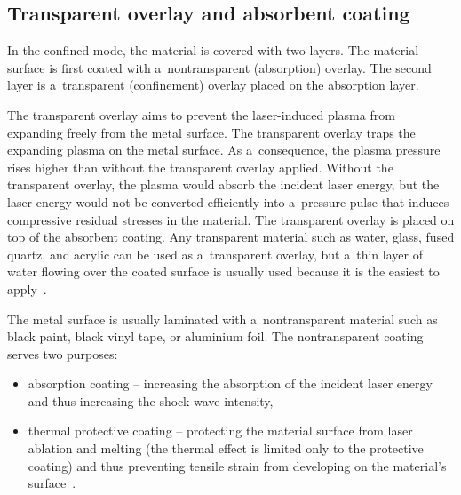 \subsection{Transparent overlay and absorbent coating}

In the confined mode, the material is covered with two layers. The material surface is first coated with a~nontransparent (absorption) overlay. The second layer is a~transparent (confinement) overlay placed on the absorption layer.

The transparent overlay aims to prevent the laser-induced plasma from expanding freely from the metal surface.  The transparent overlay traps the expanding plasma on the metal surface. As a~consequence, the plasma pressure rises higher than without the transparent overlay applied. Without the transparent overlay, the plasma would absorb the incident laser energy, but the laser energy would not be converted efficiently into a~pressure pulse that induces compressive residual stresses in the material. The transparent overlay is placed on top of the absorbent coating. Any transparent material such as water, glass, fused quartz, and acrylic can be used as a~transparent overlay, but a~thin layer of water flowing over the coated surface is usually used because it is the easiest to apply~\cite{clauer_lahrman_2001}.

The metal surface is usually laminated with a~nontransparent material such as black paint, black vinyl tape, or aluminium foil. The nontransparent coating serves two purposes:

\begin{itemize}
    \item absorption coating -- increasing the absorption of the incident laser energy and thus increasing the shock wave intensity,
    \item thermal protective coating -- protecting the material surface from laser ablation and melting (the thermal effect is limited only to the protective coating) and thus preventing tensile strain from developing on the material's surface~\cite{hong_wang_guo_wu_wang_dai_xia_xie_1998}.
\end{itemize}

